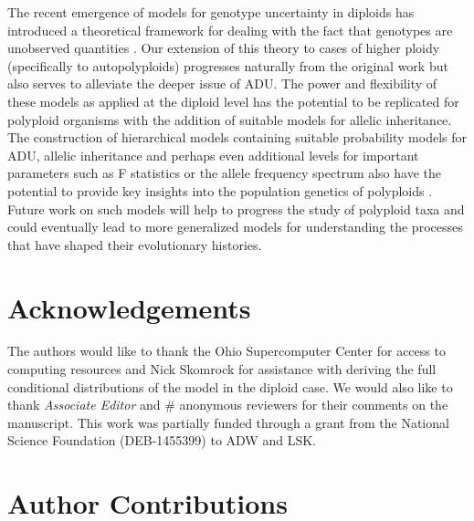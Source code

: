 \documentclass[11pt,english,letterpaper,oneside]{article}
\begin{document}
The recent emergence of models for genotype uncertainty in diploids has introduced a theoretical framework for dealing with the fact that genotypes are unobserved quantities \citep{gompert2012bgc,buerkle2013popModels}. Our extension of this theory to cases of higher ploidy (specifically to autopolyploids) progresses naturally from the original work but also serves to alleviate the deeper issue of ADU. The power and flexibility of these models as applied at the diploid level has the potential to be replicated for polyploid organisms with the addition of suitable models for allelic inheritance. The construction of hierarchical models containing suitable probability models for ADU, allelic inheritance and perhaps even additional levels for important parameters such as F statistics or the allele frequency spectrum also have the potential to provide key insights into the population genetics of polyploids \citep{gompert2011bamova,buerkle2013popModels}. Future work on such models will help to progress the study of polyploid taxa and could eventually lead to more generalized models for understanding the processes that have shaped their evolutionary histories.
\medskip

\section*{Acknowledgements}           %

The authors would like to thank the Ohio Supercomputer Center for access to computing resources and Nick Skomrock for assistance with deriving the full conditional distributions of the model in the diploid case. We would also like to thank \textit{Associate Editor} and \# anonymous reviewers for their comments on the manuscript. This work was partially funded through a grant from the National Science Foundation (DEB-1455399) to ADW and LSK.
\bigskip



\singlespacing




\doublespacing

\section*{Author Contributions}        %
\end{document}
